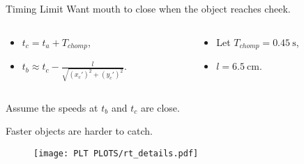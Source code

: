 \documentclass[compress,12pt,mp]{beamer}
\begin{document}
\begin{frame}{Timing Limit}
    Want mouth to close when the object reaches cheek. %
        \begin{columns}

    \begin{column}{0.5\linewidth}
    \begin{itemize}
    \item $t_c=t_a+T_{chomp}$,
    \item $t_{b}\approx t_{c}-\frac{l}{\sqrt{(x_{c}')^2+(y_{c}')^2}}$.
    \end{itemize}
    \end{column}
    \begin{column}{0.5\linewidth}
    \begin{itemize}
    \item Let $T_{chomp}=\SI{0.45}{\s}$,
    \item $l=\SI{6.5}{\cm}$.

\end{itemize}
\end{column}
\end{columns}
Assume the speeds at $t_b$ and $t_c$ are close.

Faster objects are harder to catch.
\begin{figure}
  \centering
  \texttt{[image: PLT PLOTS/rt\_details.pdf]}
\end{figure}
\end{frame}
\end{document}
